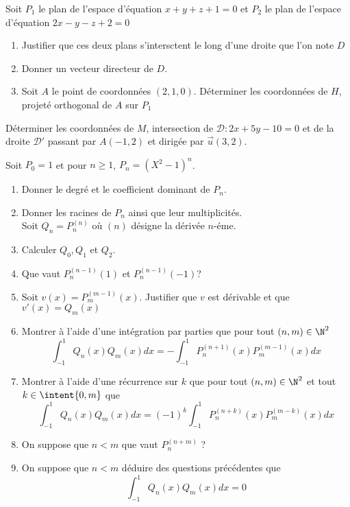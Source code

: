 \documentclass[a4paper, 11pt,reqno]{article}
\begin{document}
\newpage
\begin{exercice}
Soit $P_1$ le plan de l'espace d'équation $x+y+z+1=0$ et $P_2$ le plan de l'espace  d'équation $2x-y-z+2=0$
\begin{enumerate}
\item Justifier que ces deux plans s'intersctent le long d'une droite que l'on note $D$
\item Donner un vecteur directeur de $D$. 
\item Soit $A$ le point de coordonnées $(2,1,0)$. Déterminer les coordonnées de $H$,  projeté orthogonal de $A$ sur $P_1$
\end{enumerate}
\end{exercice}
\vspace{2cm}
\begin{exercice}  \;
D\'eterminer les coordonnées de $M$, intersection de $\mathcal{D} : 2x+5y-10=0$ et de la droite $\mathcal{D}'$ passant par $A(-1,2)$ et dirig\'ee par $\vec{u}(3,2)$.
\end{exercice}
\vspace{2cm}
\begin{exercice}
Soit $P_0=1$ et pour $n\geq 1$,  $P_n =(X^2-1)^n$. 
\begin{enumerate}
\item Donner le degré et le coefficient dominant de $P_n$. 
\item Donner les racines de $P_n$ ainsi que leur multiplicités. \\

Soit $Q_n= P_n^{(n)}$ où $(n)$ désigne la dérivée $n$-éme. 
\item Calculer $Q_0, Q_1$ et $Q_2$. 
\item Que vaut $P_n^{(n-1)} (1)$ et $P_n^{(n-1)} (-1)$?
\item Soit $v(x)= P_m^{(m-1)}(x)$. Justifier que $v$ est dérivable et que $v'(x)=Q_m(x)$
\item Montrer à l'aide d'une intégration par parties que pour tout $(n,m)\in \N^2$ 
$$\int_{-1}^{1} Q_n(x) Q_m(x)dx = -\int_{-1}^{1} P_n^{(n+1)}(x) P_m^{(m-1)} (x)dx$$
\item Montrer à l'aide d'une récurrence sur $k$ que pour tout $(n,m)\in \N^2$ et tout $k\in\intent{0,m}$ que 
$$\int_{-1}^{1} Q_n(x) Q_m(x)dx = (-1)^k\int_{-1}^{1} P_n^{(n+k)}(x) P_m^{(m-k)} (x)dx$$
\item On suppose que $n<m$ que vaut $P_n^{(n+m)}$ ?
\item On suppose que $n<m$ déduire des questions précédentes que 
$$\int_{-1}^{1} Q_n(x) Q_m(x)dx = 0$$
\end{enumerate}
\end{exercice}
\end{document}
